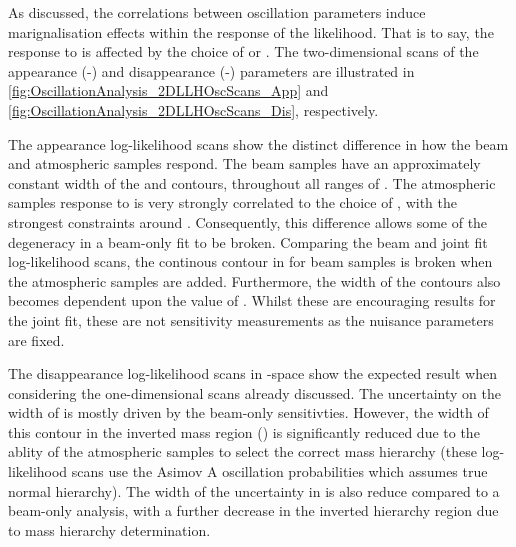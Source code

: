 As discussed, the correlations between oscillation parameters induce marignalisation effects within the response of the likelihood. That is to say, the response to \dcp is affected by the choice of \sinsqreac or \sinsqatm. The two-dimensional scans of the appearance (\sinsqreac-\dcp) and disappearance (\sinsqatm-\delmsqatm) parameters are illustrated in \autoref{fig:OscillationAnalysis_2DLLHOscScans_App} and \autoref{fig:OscillationAnalysis_2DLLHOscScans_Dis}, respectively.

The appearance log-likelihood scans show the distinct difference in how the beam and atmospheric samples respond. The beam samples have an approximately constant width of the \quickmath{2\sigma} and \quickmath{3\sigma} contours, throughout all ranges of \dcp. The atmospheric samples response to \dcp is very strongly correlated to the choice of \sinsqreac, with the strongest constraints around . Consequently, this difference allows some of the degeneracy in a beam-only fit to be broken. Comparing the beam and joint fit log-likelihood scans, the \quickmath{2\sigma} continous contour in \dcp for beam samples is broken when the atmospheric samples are added. Furthermore, the width of the \quickmath{3\sigma} contours also becomes dependent upon the value of \dcp. Whilst these are encouraging results for the joint fit, these are not sensitivity measurements as the nuisance parameters are fixed.

The disappearance log-likelihood scans in \sinsqatm-\delmsqatm space show the expected result when considering the one-dimensional scans already discussed. The uncertainty on the width of  is mostly driven by the beam-only sensitivties. However, the width of this contour in the inverted mass region () is significantly reduced due to the ablity of the atmospheric samples to select the correct mass hierarchy (these log-likelihood scans use the Asimov A oscillation probabilities which assumes true normal hierarchy). The width of the uncertainty in \sinsqatm is also reduce compared to a beam-only analysis, with a further decrease in the inverted hierarchy region due to mass hierarchy determination.

